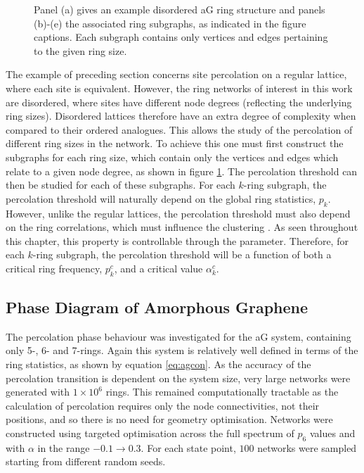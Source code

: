 \begin{figure}[bt]
     \caption{Panel (a) gives an example disordered aG ring structure and panels (b)\--(e) the associated ring subgraphs, as indicated in the figure captions. Each subgraph contains only vertices and edges pertaining to the given ring size.}
     \label{fig:subgraphs}
\end{figure}

The example of preceding section concerns site percolation on a regular lattice, where each site is equivalent.
However, the ring networks of interest in this work are disordered, where sites have different node degrees (reflecting the underlying ring sizes).
Disordered lattices therefore have an extra degree of complexity when compared to their ordered analogues.
This allows the study of the percolation of different ring sizes in the network.
To achieve this one must first construct the subgraphs for each ring size, which contain only the vertices and edges which relate to a given node degree, as shown  in figure \ref{fig:subgraphs}.
The percolation threshold can then be studied for each of these subgraphs.
For each $k$\--ring subgraph, the percolation threshold will naturally depend on the global ring statistics, $p_k$.
However, unlike the regular lattices, the percolation threshold must also depend on the ring correlations, which must influence the clustering \cite{Newman2003}.
As seen throughout this chapter, this property is controllable through the \aw{} parameter.
Therefore, for each $k$\--ring subgraph, the percolation threshold will be a function of both a critical ring frequency, $p_k^c$, and a critical \aw{} value $\alpha_k^c$.

\subsection{Phase Diagram of Amorphous Graphene}

The percolation phase behaviour was investigated for the aG system, containing only 5\--, 6\-- and 7\--rings.
Again this system is relatively well defined in terms of the ring statistics, as shown by equation \ref{eq:agcon}.
As the accuracy of the percolation transition is dependent on the system size, very large networks were generated with $1\times10^6$ rings.
This remained computationally tractable as the calculation of percolation requires only the node connectivities, not their positions, and so there is no need for geometry optimisation.
Networks were constructed using targeted optimisation across the full spectrum of $p_6$ values and with $\alpha$ in the range $-0.1\rightarrow 0.3$.
For each state point, $100$ networks were sampled starting from different random seeds. 

